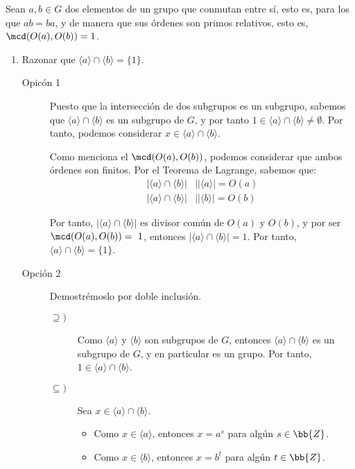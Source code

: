 \begin{ejercicio}\label{ej:3.5}
    Sean $a, b \in G$ dos elementos de un grupo que conmutan entre sí, esto es, para los que $ab = ba$, y de manera que sus órdenes son primos relativos, esto es, $\mcd(O(a), O(b)) = 1$.
    \begin{enumerate}
        \item Razonar que $\langle a \rangle \cap \langle b \rangle = \{1\}$.
        
        \begin{description}
            \item[Opicón 1]
            
            Puesto que la intersección de dos subgrupos es un subgrupo, sabemos que $\langle a\rangle\cap\langle b\rangle$ es un subgrupo de $G$, y por tanto $1\in \langle a\rangle\cap\langle b\rangle\neq \emptyset$. Por tanto, podemos considerar $x\in \langle a\rangle\cap\langle b\rangle$.

            Como menciona el $\mcd(O(a),O(b))$, podemos considerar que ambos órdenes son finitos. Por el Teorema de Lagrange, sabemos que:
            \begin{align*}
                |\langle a\rangle\cap \langle b\rangle|&\mid |\langle a\rangle|=O(a)\\
                |\langle a\rangle\cap \langle b\rangle|&\mid |\langle b\rangle|=O(b)
            \end{align*}

            Por tanto, $|\langle a\rangle\cap \langle b\rangle|$ es divisor común de $O(a)$ y $O(b)$, y por ser $\mcd(O(a),O(b))=~1$, entonces $|\langle a\rangle\cap \langle b\rangle|=1$. Por tanto, $\langle a\rangle\cap \langle b\rangle=\{1\}$.

            \item[Opción 2]
            
            Demostrémoslo por doble inclusión.
            \begin{description}
                \item[$\supseteq)$] Como $\langle a\rangle$ y $\langle b\rangle$ son subgrupos de $G$, entonces $\langle a\rangle\cap \langle b\rangle$ es un subgrupo de $G$, y en particular es un grupo. Por tanto, $1\in \langle a\rangle\cap \langle b\rangle$.
                
                \item[$\subseteq)$] Sea $x\in \langle a\rangle\cap \langle b\rangle$.
                \begin{itemize}
                    \item Como $x\in \langle a\rangle$, entonces $x=a^s$ para algún $s\in\bb{Z}$.
                    \item Como $x\in \langle b\rangle$, entonces $x=b^t$ para algún $t\in\bb{Z}$.
                \end{itemize}


\end{description}
\end{description}
\end{enumerate}
\end{ejercicio}
